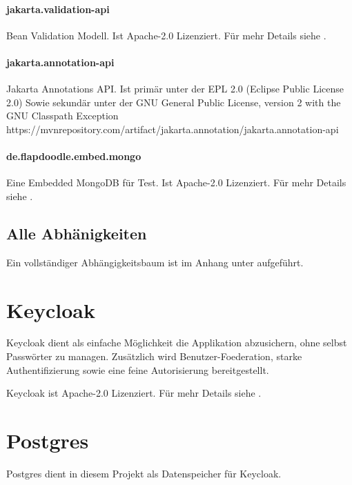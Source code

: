 \paragraph{jakarta.validation-api}
Bean Validation Modell.
Ist Apache-2.0 Lizenziert.
Für mehr Details siehe .

\paragraph{jakarta.annotation-api}
Jakarta Annotations API.
Ist primär unter der EPL 2.0 (Eclipse Public License 2.0)
Sowie sekundär unter der GNU General Public License, version 2 with the GNU Classpath Exception
https://mvnrepository.com/artifact/jakarta.annotation/jakarta.annotation-api

\paragraph{de.flapdoodle.embed.mongo}
Eine Embedded MongoDB für Test.
Ist Apache-2.0 Lizenziert.
Für mehr Details siehe .

\subsection{Alle Abhänigkeiten}
Ein vollständiger Abhängigkeitsbaum ist im Anhang unter  aufgeführt.

\section{Keycloak}\label{sec:keycloak}

Keycloak dient als einfache Möglichkeit die Applikation abzusichern, ohne selbst Passwörter zu managen.
Zusätzlich wird \gls{Benutzer-Foederation}, starke Authentifizierung sowie eine feine Autorisierung bereitgestellt.
\cite{about-keycloak}

Keycloak ist Apache-2.0 Lizenziert.
Für mehr Details siehe .

\section{Postgres}\label{sec:postgres}

Postgres dient in diesem Projekt als Datenspeicher für Keycloak.

